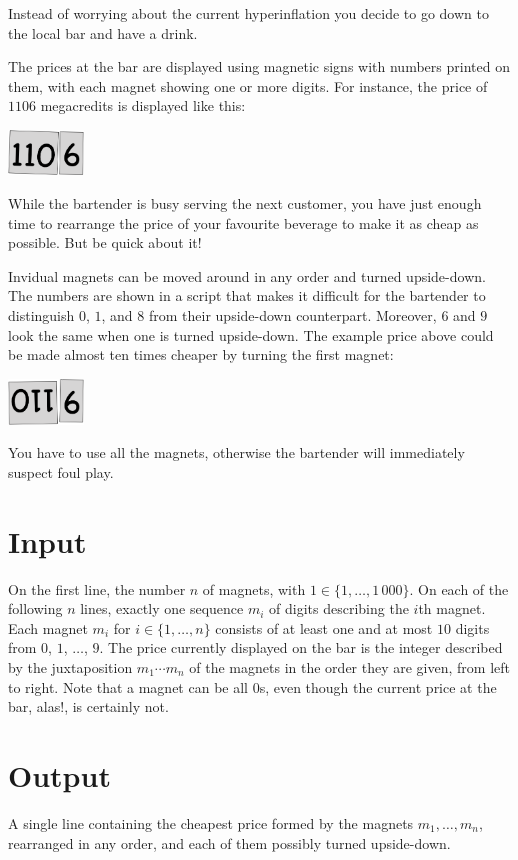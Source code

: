 

Instead of worrying about the current hyperinflation you decide to go down to the local bar and have a drink.

The prices at the bar are displayed using magnetic signs with numbers printed on them, with each magnet showing one or more digits.
For instance, the price of $1106$ megacredits is displayed like this:

\medskip
\includegraphics[width = 2cm]{img/from.png}

While the bartender is busy serving the next customer, you have just enough time to rearrange the price of your favourite beverage to make it as cheap as possible.
But be quick about it!

Invidual magnets can be moved around in any order and turned upside-down.
The numbers are shown in a script that makes it difficult for the bartender to distinguish $0$, $1$, and $8$ from their upside-down counterpart.
Moreover, $6$ and $9$ look the same when one is turned upside-down.
The example price above could be made almost ten times cheaper by turning the first magnet:

\medskip
\includegraphics[width = 2cm]{img/to.png}

You have to use all the magnets, otherwise the bartender will immediately suspect foul play.

\section*{Input}

On the first line, the number $n$ of magnets, with $1\in\{1,\ldots, 1\,000\}$.
On each of the following $n$ lines, exactly one sequence $m_i$ of digits describing the $i$th magnet.
Each magnet $m_i$ for $i\in \{1,\ldots, n\}$ consists of at least one and at most $10$ digits from $0$, $1$, $\ldots$, $9$.
The price currently displayed on the bar is the integer described by the juxtaposition $m_1\cdots m_n$ of the magnets in the order they are given, from left to right.
Note that a magnet can be all $0$s, even though the current price at the bar, alas!, is certainly not.

\section*{Output}

A single line containing the cheapest price formed by the magnets $m_1,\ldots,m_n$, rearranged in any order, and each of them possibly turned upside-down.
